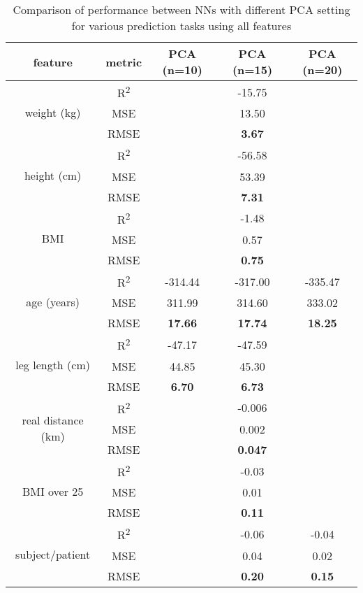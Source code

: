 \newpage
\begin{table}[H]
\begin{longtable}{|c|c|c|c|c|}
\hline
\textbf{feature} & \textbf{metric} & \textbf{PCA (n=10)} & \textbf{PCA (n=15)} & \textbf{PCA (n=20)} \\
\hline
\multirow{3}{*}{weight (kg)} & R\textsuperscript{2} & & -15.75 & \\
& MSE & & 13.50 & \\
& RMSE & & \textbf{3.67} & \\
\hline
\multirow{3}{*}{height (cm)} & R\textsuperscript{2} & & -56.58 & \\
& MSE & & 53.39 & \\
& RMSE & & \textbf{7.31} & \\
\hline
\multirow{3}{*}{BMI} & R\textsuperscript{2} & & -1.48 & \\
& MSE & & 0.57 & \\
& RMSE & & \textbf{0.75} & \\
\hline
\multirow{3}{*}{age (years)} & R\textsuperscript{2} & -314.44 & -317.00 & -335.47 \\
& MSE & 311.99 & 314.60 & 333.02 \\
& RMSE & \textbf{17.66} & \textbf{17.74} & \textbf{18.25} \\
\hline
\multirow{3}{*}{leg length (cm)} & R\textsuperscript{2} & -47.17 & -47.59 & \\
& MSE & 44.85 & 45.30 & \\
& RMSE & \textbf{6.70} & \textbf{6.73} & \\
\hline
\multirow{3}{*}{real distance (km)} & R\textsuperscript{2} & & -0.006 & \\
& MSE & & 0.002 & \\
& RMSE & & \textbf{0.047} & \\
\hline
\multirow{3}{*}{BMI over 25} & R\textsuperscript{2} & & -0.03 & \\
& MSE & & 0.01 & \\
& RMSE & & \textbf{0.11} & \\
\hline
\multirow{3}{*}{subject/patient} & R\textsuperscript{2} & & -0.06 & -0.04 \\
& MSE & & 0.04 & 0.02 \\
& RMSE & & \textbf{0.20} & \textbf{0.15} \\
\hline
\end{longtable}
\caption{Comparison of performance between NNs with different PCA setting for various prediction tasks using all features}
\label{tab:PCAdiffallfeatures}
\end{table}

